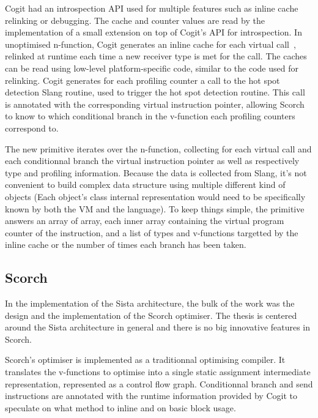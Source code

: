 \documentclass[a4paper,12pt,twoside]{../includes/ThesisStyle}
\begin{document}
Cogit had an introspection API used for multiple features such as inline cache relinking or debugging. The cache and counter values are read by the implementation of a small extension on top of Cogit's API for introspection. In unoptimised n-function, Cogit generates an inline cache for each virtual call~\cite{Deut84a,Holz91a}, relinked at runtime each time a new receiver type is met for the call. The caches can be read using low-level platform-specific code, similar to the code used for relinking. Cogit generates for each profiling counter a call to the hot spot detection Slang routine, used to trigger the hot spot detection routine. This call is annotated with the corresponding virtual instruction pointer, allowing Scorch to know to which conditional branch in the v-function each profiling counters correspond to.

The new primitive iterates over the n-function, collecting for each virtual call and each conditionnal branch the virtual instruction pointer as well as respectively type and profiling information. Because the data is collected from Slang, it's not convenient to build complex data structure using multiple different kind of objects (Each object's class internal representation would need to be specifically known by both the VM and the language). To keep things simple, the primitive answers an array of array, each inner array containing the virtual program counter of the instruction, and a list of types and v-functions targetted by the inline cache or the number of times each branch has been taken.

\subsection{Scorch}

In the implementation of the Sista architecture, the bulk of the work was the design and the implementation of the Scorch optimiser. The thesis is centered around the Sista architecture in general and there is no big innovative features in Scorch.

Scorch's optimiser is implemented as a traditionnal optimising compiler. It translates the v-functions to optimise into a single static assignment intermediate representation, represented as a control flow graph. Conditionnal branch and send instructions are annotated with the runtime information provided by Cogit to speculate on what method to inline and on basic block usage.
\end{document}
